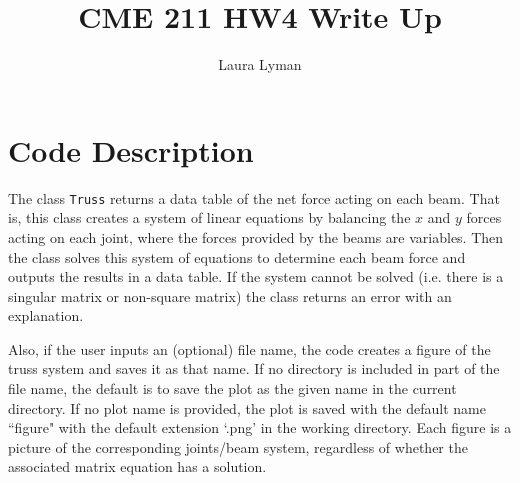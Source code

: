 \documentclass[11pt]{amsart}
\theoremstyle{definition}
\begin{document}
\title{CME 211 HW4 Write Up}
\author{Laura Lyman}

\maketitle
\vspace{-20pt}
\tableofcontents
\section{Code Description} The class \texttt{Truss} returns a data table of the net force acting on each beam. That is, this class creates a system of linear equations by balancing the $x$ and $y$ forces acting on each joint, where the forces provided
by the beams are variables. Then the class solves this system of equations to determine each beam force and outputs the results in a data table. If the system cannot be solved (i.e. there is a singular matrix or non-square matrix) the class returns an error with an explanation.

Also, if the user inputs an (optional) file name, the code creates a figure of the truss system and saves it as that name. If no directory is included in part of the file name, the default is to save the plot as the given name in the current directory. If no plot name is provided, the plot is saved with the default name ``figure" with the default extension `.png' in the working directory. Each figure is a picture of the corresponding joints/beam system, regardless of whether the associated matrix equation has a solution.
\end{document}
